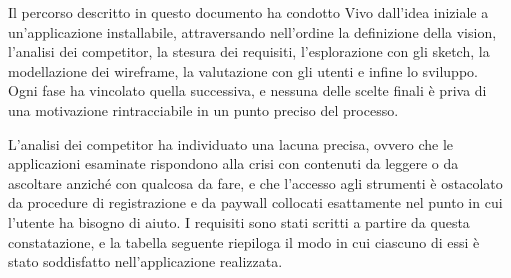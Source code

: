 Il percorso descritto in questo documento ha condotto Vivo dall'idea iniziale a un'applicazione installabile, attraversando nell'ordine la definizione della vision, l'analisi dei competitor, la stesura dei requisiti, l'esplorazione con gli sketch, la modellazione dei wireframe, la valutazione con gli utenti e infine lo sviluppo.
Ogni fase ha vincolato quella successiva, e nessuna delle scelte finali è priva di una motivazione rintracciabile in un punto preciso del processo.

L'analisi dei competitor ha individuato una lacuna precisa, ovvero che le applicazioni esaminate rispondono alla crisi con contenuti da leggere o da ascoltare anziché con qualcosa da fare, e che l'accesso agli strumenti è ostacolato da procedure di registrazione e da paywall collocati esattamente nel punto in cui l'utente ha bisogno di aiuto.
I requisiti sono stati scritti a partire da questa constatazione, e la tabella seguente riepiloga il modo in cui ciascuno di essi è stato soddisfatto nell'applicazione realizzata.

